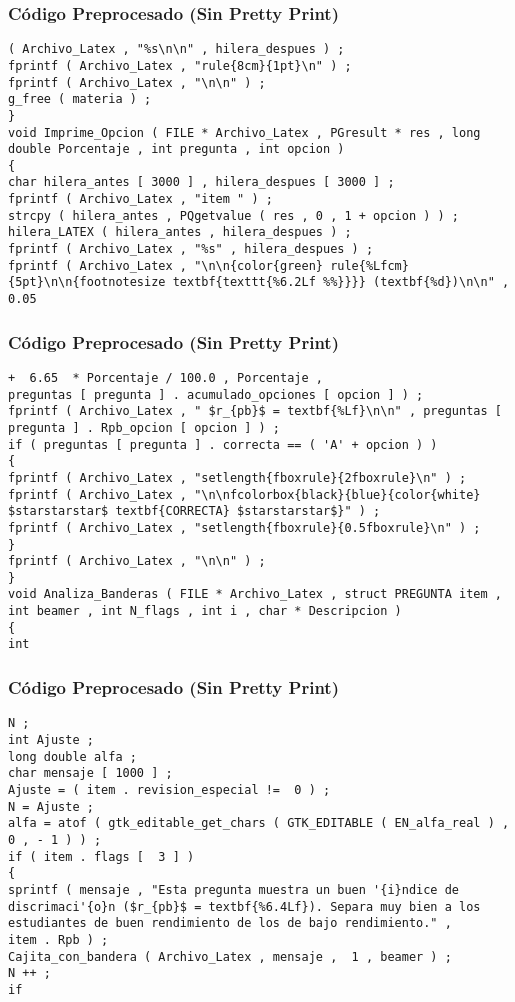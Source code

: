 \documentclass{beamer}
\begin{document}
\begin{frame}[fragile]
\frametitle{C\'odigo Preprocesado (Sin Pretty Print)}
\begin{lstlisting}[style=CStyle]
( Archivo_Latex , "%s\n\n" , hilera_despues ) ; 
fprintf ( Archivo_Latex , "rule{8cm}{1pt}\n" ) ; 
fprintf ( Archivo_Latex , "\n\n" ) ; 
g_free ( materia ) ; 
} 
void Imprime_Opcion ( FILE * Archivo_Latex , PGresult * res , long double Porcentaje , int pregunta , int opcion ) 
{ 
char hilera_antes [ 3000 ] , hilera_despues [ 3000 ] ; 
fprintf ( Archivo_Latex , "item " ) ; 
strcpy ( hilera_antes , PQgetvalue ( res , 0 , 1 + opcion ) ) ; 
hilera_LATEX ( hilera_antes , hilera_despues ) ; 
fprintf ( Archivo_Latex , "%s" , hilera_despues ) ; 
fprintf ( Archivo_Latex , "\n\n{color{green} rule{%Lfcm}{5pt}\n\n{footnotesize textbf{texttt{%6.2Lf %%}}}} (textbf{%d})\n\n" , 
0.05 \end{lstlisting}
\end{frame}
\begin{frame}[fragile]
\frametitle{C\'odigo Preprocesado (Sin Pretty Print)}
\begin{lstlisting}[style=CStyle]
+  6.65  * Porcentaje / 100.0 , Porcentaje , 
preguntas [ pregunta ] . acumulado_opciones [ opcion ] ) ; 
fprintf ( Archivo_Latex , " $r_{pb}$ = textbf{%Lf}\n\n" , preguntas [ pregunta ] . Rpb_opcion [ opcion ] ) ; 
if ( preguntas [ pregunta ] . correcta == ( 'A' + opcion ) ) 
{ 
fprintf ( Archivo_Latex , "setlength{fboxrule}{2fboxrule}\n" ) ; 
fprintf ( Archivo_Latex , "\n\nfcolorbox{black}{blue}{color{white} $starstarstar$ textbf{CORRECTA} $starstarstar$}" ) ; 
fprintf ( Archivo_Latex , "setlength{fboxrule}{0.5fboxrule}\n" ) ; 
} 
fprintf ( Archivo_Latex , "\n\n" ) ; 
} 
void Analiza_Banderas ( FILE * Archivo_Latex , struct PREGUNTA item , int beamer , int N_flags , int i , char * Descripcion ) 
{ 
int \end{lstlisting}
\end{frame}
\begin{frame}[fragile]
\frametitle{C\'odigo Preprocesado (Sin Pretty Print)}
\begin{lstlisting}[style=CStyle]
N ; 
int Ajuste ; 
long double alfa ; 
char mensaje [ 1000 ] ; 
Ajuste = ( item . revision_especial !=  0 ) ; 
N = Ajuste ; 
alfa = atof ( gtk_editable_get_chars ( GTK_EDITABLE ( EN_alfa_real ) , 0 , - 1 ) ) ; 
if ( item . flags [  3 ] ) 
{ 
sprintf ( mensaje , "Esta pregunta muestra un buen '{i}ndice de discrimaci'{o}n ($r_{pb}$ = textbf{%6.4Lf}). Separa muy bien a los estudiantes de buen rendimiento de los de bajo rendimiento." , 
item . Rpb ) ; 
Cajita_con_bandera ( Archivo_Latex , mensaje ,  1 , beamer ) ; 
N ++ ; 
if \end{lstlisting}
\end{frame}
\end{document}
